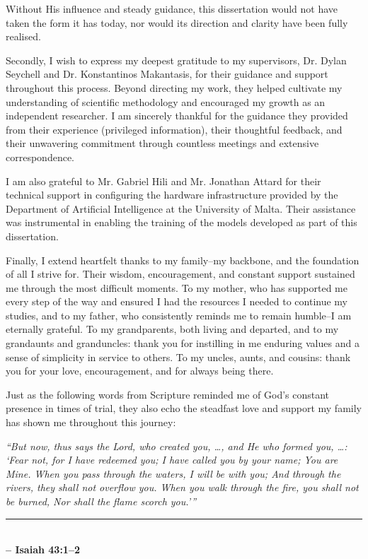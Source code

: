 \bigskip\bigskip

\noindent Without His influence and steady guidance, this dissertation would not have taken the form it has today, nor would its direction and clarity have been fully realised.

\bigskip

\noindent Secondly, I wish to express my deepest gratitude to my supervisors, Dr. Dylan Seychell and Dr. Konstantinos Makantasis, for their guidance and support throughout this process. Beyond directing my work, they helped cultivate my understanding of scientific methodology and encouraged my growth as an independent researcher. I am sincerely thankful for the guidance they provided from their experience (privileged information), their thoughtful feedback, and their unwavering commitment through countless meetings and extensive correspondence.

\bigskip

\noindent I am also grateful to Mr. Gabriel Hili and Mr. Jonathan Attard for their technical support in configuring the hardware infrastructure provided by the Department of Artificial Intelligence at the University of Malta. Their assistance was instrumental in enabling the training of the models developed as part of this dissertation.

\bigskip

\noindent Finally, I extend heartfelt thanks to my family--my backbone, and the foundation of all I strive for. Their wisdom, encouragement, and constant support sustained me through the most difficult moments. To my mother, who has supported me every step of the way and ensured I had the resources I needed to continue my studies, and to my father, who consistently reminds me to remain humble--I am eternally grateful. To my grandparents, both living and departed, and to my grandaunts and granduncles: thank you for instilling in me enduring values and a sense of simplicity in service to others. To my uncles, aunts, and cousins: thank you for your love, encouragement, and for always being there.

\bigskip

\noindent Just as the following words from Scripture reminded me of God’s constant presence in times of trial, they also echo the steadfast love and support my family has shown me throughout this journey:

\bigskip\bigskip

\noindent
\textit{``But now, thus says the Lord, who created you, \ldots, and He who formed you, \ldots : ‘Fear not, for I have redeemed you; I have called you by your name; You are Mine. When you pass through the waters, I will be with you; And through the rivers, they shall not overflow you. When you walk through the fire, you shall not be burned, Nor shall the flame scorch you.’''} \\[1ex]
\noindent\rule{\textwidth}{1pt} \\[1ex]
\hfill \textbf{-- Isaiah 43:1–2}

